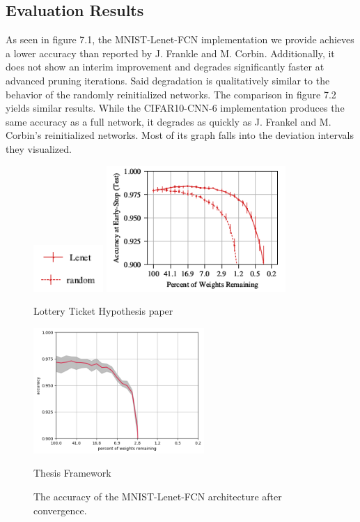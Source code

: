 \subsection*{Evaluation Results}
As seen in figure 7.1, the MNIST-Lenet-FCN implementation we provide achieves a lower accuracy than reported by J. Frankle and M. Corbin. Additionally, it does not show an interim improvement and degrades significantly faster at advanced pruning iterations. Said degradation is qualitatively similar to the behavior of the randomly reinitialized networks.
The comparison in figure 7.2 yields similar results. While the CIFAR10-CNN-6 implementation produces the same accuracy as a full network, it degrades as quickly as J. Frankel and M. Corbin's reinitialized networks. Most of its graph falls into the deviation intervals they visualized.

\begin{figure}
	\begin{minipage}{\textwidth}
		\centering
		\includegraphics[width=100px]{gfx/7-Evaluation/LTH_3_legend.png}
	\end{minipage}
	\begin{minipage}{0.5\textwidth}
		\centering
		\includegraphics[height=180px]{gfx/7-Evaluation/LTH_0.png}
		\caption*{Lottery Ticket Hypothesis paper}
		\label{?}
	\end{minipage}\hfill
	\begin{minipage}{0.5\textwidth}
		\centering
		\includegraphics[height=180px]{gfx/Experiments/Reproduction-MNIST-FCN/accuracy/converged.png}
		\caption*{Thesis Framework}
		\label{?}
	\end{minipage}
	\caption{The accuracy of the MNIST-Lenet-FCN architecture after convergence.}
	\label{fig:ABC}
\end{figure}

